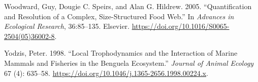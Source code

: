 \documentclass{article}
\begin{document}
\leavevmode\hypertarget{ref-woodwardQuantificationResolutionComplex2005}{}%
Woodward, Guy, Dougie C. Speirs, and Alan G. Hildrew. 2005.
``Quantification and Resolution of a Complex, Size-Structured Food
Web.'' In \emph{Advances in Ecological Research}, 36:85--135. Elsevier.
\url{https://doi.org/10.1016/S0065-2504(05)36002-8}.

\leavevmode\hypertarget{ref-yodzisLocalTrophodynamicsInteraction1998}{}%
Yodzis, Peter. 1998. ``Local Trophodynamics and the Interaction of
Marine Mammals and Fisheries in the Benguela Ecosystem.'' \emph{Journal
of Animal Ecology} 67 (4): 635--58.
\url{https://doi.org/10.1046/j.1365-2656.1998.00224.x}.



\end{document}
